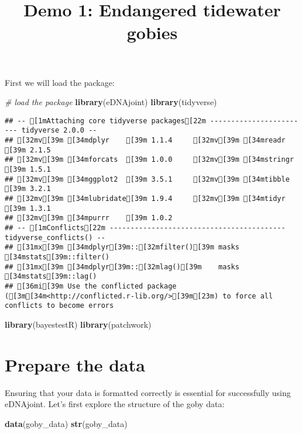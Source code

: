 \documentclass[
]{article}
\title{Demo 1: Endangered tidewater gobies}
\author{}
\date{\vspace{-2.5em}}
\newenvironment{Shaded}{\begin{snugshade}}{\end{snugshade}}
\newcommand{\CommentTok}[1]{\textcolor[rgb]{0.56,0.35,0.01}{\textit{#1}}}
\newcommand{\FunctionTok}[1]{\textcolor[rgb]{0.13,0.29,0.53}{\textbf{#1}}}
\newcommand{\NormalTok}[1]{#1}
\begin{document}
\maketitle

First we will load the package:

\begin{Shaded}
\begin{Highlighting}[]
\CommentTok{\# load the package}
\FunctionTok{library}\NormalTok{(eDNAjoint)}
\FunctionTok{library}\NormalTok{(tidyverse)}
\end{Highlighting}
\end{Shaded}

\begin{verbatim}
## -- [1mAttaching core tidyverse packages[22m ------------------------ tidyverse 2.0.0 --
## [32mv[39m [34mdplyr    [39m 1.1.4     [32mv[39m [34mreadr    [39m 2.1.5
## [32mv[39m [34mforcats  [39m 1.0.0     [32mv[39m [34mstringr  [39m 1.5.1
## [32mv[39m [34mggplot2  [39m 3.5.1     [32mv[39m [34mtibble   [39m 3.2.1
## [32mv[39m [34mlubridate[39m 1.9.4     [32mv[39m [34mtidyr    [39m 1.3.1
## [32mv[39m [34mpurrr    [39m 1.0.2     
## -- [1mConflicts[22m ------------------------------------------ tidyverse_conflicts() --
## [31mx[39m [34mdplyr[39m::[32mfilter()[39m masks [34mstats[39m::filter()
## [31mx[39m [34mdplyr[39m::[32mlag()[39m    masks [34mstats[39m::lag()
## [36mi[39m Use the conflicted package ([3m[34m<http://conflicted.r-lib.org/>[39m[23m) to force all conflicts to become errors
\end{verbatim}

\begin{Shaded}
\begin{Highlighting}[]
\FunctionTok{library}\NormalTok{(bayestestR)}
\FunctionTok{library}\NormalTok{(patchwork)}
\end{Highlighting}
\end{Shaded}

\section{Prepare the data}\label{prepare-the-data}

Ensuring that your data is formatted correctly is essential for
successfully using eDNAjoint. Let's first explore the structure of the
goby data:

\begin{Shaded}
\begin{Highlighting}[]
\FunctionTok{data}\NormalTok{(goby\_data)}
\FunctionTok{str}\NormalTok{(goby\_data)}
\end{Highlighting}
\end{Shaded}
\end{document}
